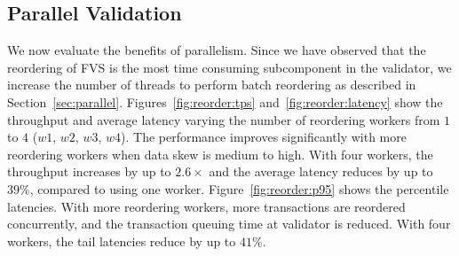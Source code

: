 
\subsection{Parallel Validation}
\label{sec:experiments:parallel}


We now evaluate the benefits of parallelism. Since we have observed that the reordering of FVS is the most time consuming subcomponent in the validator, we increase the number of threads to perform batch reordering as described in Section~\ref{sec:parallel}. 
Figures~\ref{fig:reorder:tps} and~\ref{fig:reorder:latency} show the throughput
and average latency varying the number of reordering workers from $1$ to $4$
($w1$, $w2$, $w3$, $w4$). The performance improves significantly with more reordering workers when data skew is medium to high. With four workers, the throughput increases by up to $2.6\times$ and the average latency reduces by up to $39\%$, compared to using one worker. Figure~\ref{fig:reorder:p95} shows the percentile latencies. With more reordering workers, more transactions are reordered concurrently, and the transaction queuing time at validator is reduced. With four workers, the tail latencies reduce by up to $41\%$.

